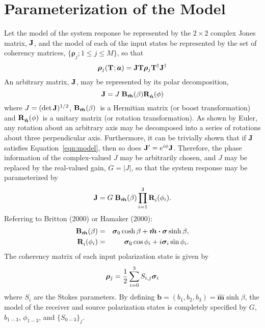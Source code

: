 \documentclass[12pt]{article}
\newcommand{\mbf}[1]{\mbox{\boldmath $#1$}}
\newcommand{\rotation}[3]{{\ensuremath{ {\bf R}^{#3}_{#1}({#2}) }}}
\newcommand{\rotat}[1][\bm{\hat{n}}]{\rotation{#1}{\phi}{ }}
\newcommand{\boost}[1][m]{{\ensuremath{ {\bf B}_{\bm{\hat {#1}}}(\beta) }}}
\newcommand{\model}[1][ ]{\ensuremath{{\bm\rho}_j({{\bf T}_{#1}};{\mbf{a}}) }}
\begin{document}
\section{Parameterization of the Model}

Let the model of the system response be represented by the $2\times2$
complex Jones matrix, ${\bf J}$, and the model of each of the input states
be represented by the set of coherency matrices, $\{\bm\rho_j; 1\le j\le M\}$,
so that
\begin{equation}\label{eqn:model}
\model = {\bf JT}{\bm\rho}_j{\bf T}^\dagger{\bf J}^\dagger
\end{equation}
An arbitrary matrix, ${\bf J}$, may be represented by its polar decomposition,
\begin{equation}
{\bf J} = J \; \boost \rotat
\end{equation}
where $J=(\det{\bf J})^{1/2}$, \boost\ is a Hermitian matrix (or boost
transformation) and \rotat\ is a unitary matrix (or rotation
transformation).  As shown by Euler, any rotation about an arbitrary
axis may be decomposed into a series of rotations about three
perpendicular axis.  Furthermore, it can be trivially shown that if
{\bf J} satisfies Equation~\ref{eqn:model}, then so does
${\bf J}^\prime = e^{i\phi}{\bf J}$.  Therefore, the phase information of the
complex-valued $J$ may be arbitrarily chosen, and $J$ may be replaced by the
real-valued gain, $G=|J|$, so that the system response may be
parameterized by
\begin{equation}
{\bf J} = G \; \boost \prod_{i=1}^3 \rotation{i}{\phi_i}{ }.
\label{eqn:polar_decomposition}
\end{equation}
Referring to Britton (2000) or Hamaker (2000):
\begin{eqnarray}\label{eqn:boost}
\boost &=& \bm{\sigma}_0\cosh\beta + \bm{\hat{m}\cdot\sigma}\sinh\beta, \\
\rotation{i}{\phi_i}{ } &=& \bm{\sigma}_0\cos\phi_i + i\bm{\sigma}_i\sin\phi_i.
\label{eqn:rotation}
\end{eqnarray}
The coherency matrix of each input polarization state is given by
\begin{equation}\label{eqn:stokes}
{\bm\rho}_j = {1\over2}\sum_{i=0}^3 S_{i,j}\bm{\sigma}_i
\end{equation}
where $S_i$ are the Stokes parameters.
By defining $\bm{b}=(b_1,b_2,b_3)=\bm{\hat{m}}\sinh\beta$, the model of
the receiver and source polarization states is completely specified by $G$,
$b_{1-3}$, $\phi_{1-3}$, and $\{S_{0-3}\}_j$.
\end{document}
